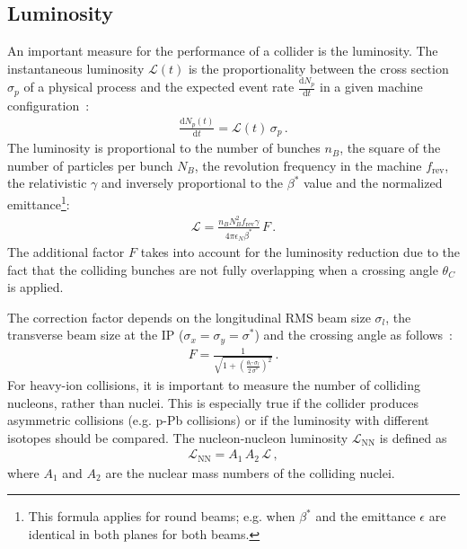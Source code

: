 \subsection{Luminosity} \label{chap:lumi}

An important measure for the performance of a collider is the luminosity. The instantaneous luminosity $\mathcal{L}(t)$ is the proportionality between the cross section $\sigma_p$ of a physical process and the expected event rate $\frac{\mathrm{d}N_p}{\mathrm{d}t}$ in a given machine configuration~\cite{wiedemann1999particle}:
%
\begin{align}
  \frac{\mathrm{d}N_p (t)}{\mathrm{d}t} = \mathcal{L}(t) \, \sigma_p \, . \label{eq:eventrate}
\end{align}
%
The luminosity is proportional to the number of bunches $n_B$, the square of the number of particles per bunch $N_B$, the revolution frequency in the machine $f_\text{rev}$, the relativistic $\gamma$ and inversely proportional to the $\beta^*$ value and the normalized emittance\footnote{This formula applies for round beams; e.g. when $\beta^*$ and the emittance $\epsilon$ are identical in both planes for both beams.}:
\begin{align}
  \mathcal{L} = \frac{n_B N_B^2 f_\text{rev} \gamma}{4 \pi \epsilon_N \beta^*} \, F \, . \label{eq:lumi}
\end{align}
%
The additional factor $F$ takes into account for the luminosity reduction due to the fact that the colliding bunches are not fully overlapping when a crossing angle $\theta_C$ is applied. 

The correction factor depends on the longitudinal RMS beam size $\sigma_l$, the transverse beam size at the IP \mbox{($\sigma_x=\sigma_y=\sigma^*$)} and the crossing angle as follows~\cite{proceedingsCAS:herr}:
%
\begin{align}
  F = \frac{1}{\sqrt{1 + \left( \frac{\theta_C \, \sigma_l }{2 \, \sigma^*}  \right)^2 }} \, .
\end{align}
%
For heavy-ion collisions, it is important to measure the number of colliding nucleons, rather than nuclei. This is especially true if the collider produces asymmetric collisions (e.g. p-Pb collisions) or if the luminosity with different isotopes should be compared. The nucleon-nucleon luminosity $\mathcal{L}_\text{NN}$ is defined as
%
\begin{align}
  \mathcal{L}_\text{NN} = A_1 \, A_2 \, \mathcal{L} \, ,
\end{align}
where $A_1$ and $A_2$ are the nuclear mass numbers of the colliding nuclei.

